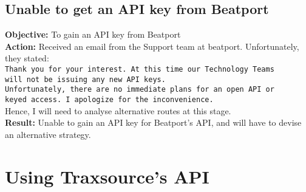\documentclass{article}
\begin{document}
\subsection{Unable to get an API key from Beatport}
\textbf{Objective:} To gain an API key from Beatport\\
\textbf{Action:} Received an email from the Support team at beatport. Unfortunately, they stated:\\
\texttt{Thank you for your interest. At this time our Technology Teams \\will not be issuing any new API keys.\\
Unfortunately, there are no immediate plans for an open API or \\keyed access. I apologize for the inconvenience.\\
}
Hence, I will need to analyse alternative routes at this stage.\\
\textbf{Result:} Unable to gain an API key for Beatport's API, and will have to devise an alternative strategy.
\section{Using Traxsource's API}
\end{document}

